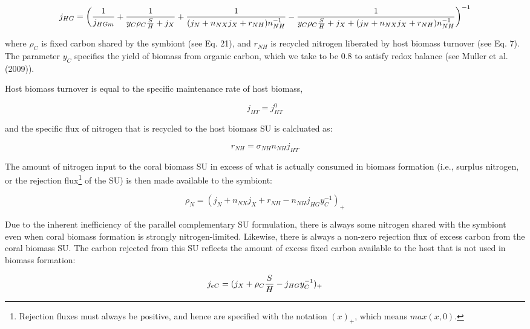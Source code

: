 \documentclass[]{elsarticle} %
\begin{document}
\begin{equation} j_{HG} = \bigg({1 \over j_{HGm}} + {1 \over {y_{C}\rho_C{S \over H} + j_X}} + {1 \over {(j_N + n_{NX}j_X + r_{NH})n_{NH}^{-1}}} - {1 \over {y_{C}{\rho_C{S \over H} + j_X} + (j_N + n_{NX}j_X + r_{NH})n_{NH}^{-1}}}\bigg)^{-1} \end{equation}

where \(\rho_C\) is fixed carbon shared by the symbiont (see Eq. 21),
and \(r_{NH}\) is recycled nitrogen liberated by host biomass turnover
(see Eq. 7). The parameter \(y_C\) specifies the yield of biomass from
organic carbon, which we take to be 0.8 to satisfy redox balance (see
Muller et al. (2009)).

Host biomass turnover is equal to the specific maintenance rate of host
biomass,

\begin{equation} j_{HT}=j_{HT}^0 \end{equation}

and the specific flux of nitrogen that is recycled to the host biomass
SU is calcluated as:

\begin{equation} r_{NH}=\sigma_{NH}n_{NH}j_{HT} \end{equation}

The amount of nitrogen input to the coral biomass SU in excess of what
is actually consumed in biomass formation (i.e., surplus nitrogen, or
the rejection flux\footnote{Rejection fluxes must always be positive,
  and hence are specified with the notation \((x)_+\), which means
  \(max(x, 0)\).} of the SU) is then made available to the symbiont:

\begin{equation} \rho_N = (j_N + n_{NX}j_X + r_{NH} - n_{NH}j_{HG}y_{C}^{-1})_+ \end{equation}

Due to the inherent inefficiency of the parallel complementary SU
formulation, there is always some nitrogen shared with the symbiont even
when coral biomass formation is strongly nitrogen-limited. Likewise,
there is always a non-zero rejection flux of excess carbon from the
coral biomass SU. The carbon rejected from this SU reflects the amount
of excess fixed carbon available to the host that is not used in biomass
formation:

\begin{equation} j_{eC} = (j_X + \rho_C{S \over H} - j_{HG}y_{C}^{-1})_+ \end{equation}
\end{document}

